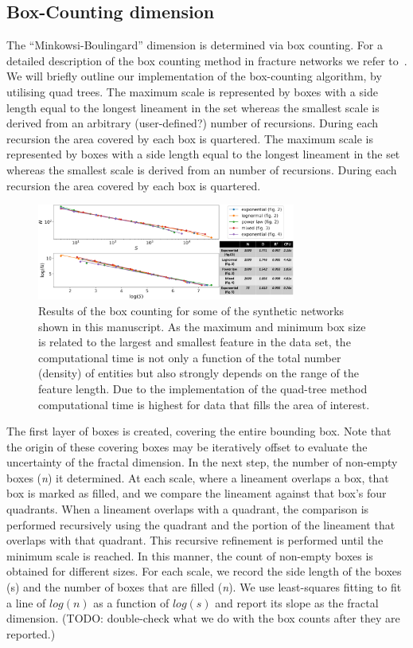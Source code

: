 \documentclass[a4paper,fleqn]{cas-sc}
\begin{document}
\subsection{Box-Counting dimension}
The ``Minkowsi-Boulingard'' dimension is determined via box counting. For a detailed description of the box counting method in fracture networks we refer to~\citep{Roy2017}.  We will briefly outline our implementation of the box-counting algorithm, by utilising quad trees.
The maximum scale is represented by boxes with a side length equal to the longest lineament in the set whereas the smallest scale is derived from an arbitrary (user-defined?) number of recursions. During each recursion the area covered by each box is quartered.
The maximum scale is represented by boxes with a side length equal to the longest lineament in the set whereas the smallest scale is derived from an number of recursions. During each recursion the area covered by each box is quartered.

\begin{figure}[h]
\centering
	\includegraphics[width=8.5cm]{fig03.jpg}
	\caption{Results of the box counting for some of the synthetic networks shown in this manuscript. As the maximum and minimum box size is related to the largest and smallest feature in the data set, the computational time is not only a function of the total number (density) of entities but also strongly depends on the range of the feature length. Due to the implementation of the quad-tree method computational time is highest for data that fills the area of interest. }
\label{fig03}
\end{figure}

The first layer of boxes is created, covering the entire bounding box. Note that the origin of these covering boxes may be iteratively offset to evaluate the uncertainty of the fractal dimension. In the next step, the number of non-empty boxes (\textit{n}) it determined. At each scale, where a lineament overlaps a box, that box is marked as filled, and we compare the lineament against that box's four quadrants. When a lineament overlaps with a quadrant, the comparison is performed recursively using the quadrant and the portion of the lineament that overlaps with that quadrant. This recursive refinement is performed until the minimum scale is reached. In this manner, the count of non-empty boxes is obtained for different sizes. For each scale, we record the side length of the boxes (s) and the number of boxes that are filled (\textit{n}). We use least-squares fitting to fit a line of $log(n)$ as a function of $log(s)$ and report its slope as the fractal dimension. (TODO: double-check what we do with the box counts after they are reported.)
\end{document}
